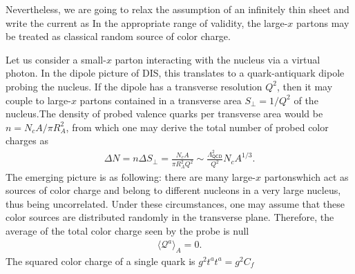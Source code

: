 Nevertheless, we are going to relax the assumption of an infinitely thin sheet and write the current as
In the appropriate range of validity, the large-$x$ partons may be treated as {\sffamily\color{ming}classical random source} of color charge.

\begin{note}
    Let us consider a small-$x$ parton interacting with the nucleus via a virtual photon. In the dipole picture of {\sffamily DIS}, this translates to a quark-antiquark dipole probing the nucleus. If the dipole has a transverse resolution $Q^2$, then it may couple to large-$x$ partons contained in a transverse area $S_\perp=1/Q^2$ of the nucleus.The density of probed valence quarks per transverse area would be $n=N_cA/\pi R_A^2$, from which one may derive the total number of probed color charges as
    \begin{align}\label{glasma5}
        \Delta N=n\Delta S_\perp=\frac{N_cA}{\pi R_A^2Q^2}\sim \frac{\Lambda_{\textsf{QCD}}^2}{Q^2}N_cA^{1/3}.
    \end{align}
    The emerging picture is as following: there are many large-$x$ partonswhich act as sources of color charge and belong to different nucleons in a very large nucleus, thus being uncorrelated. Under these circumstances, one may assume that these color sources are {\sffamily\color{ming}distributed randomly} in the transverse plane. Therefore, the average of the total color charge seen by the probe is null
    \begin{align}\label{glasma6}
        \langle \mathcal{Q}^a \rangle_A =0.
    \end{align}
    The squared color charge of a single quark is $g^2t^at^a=g^2C_f$
\end{note}
